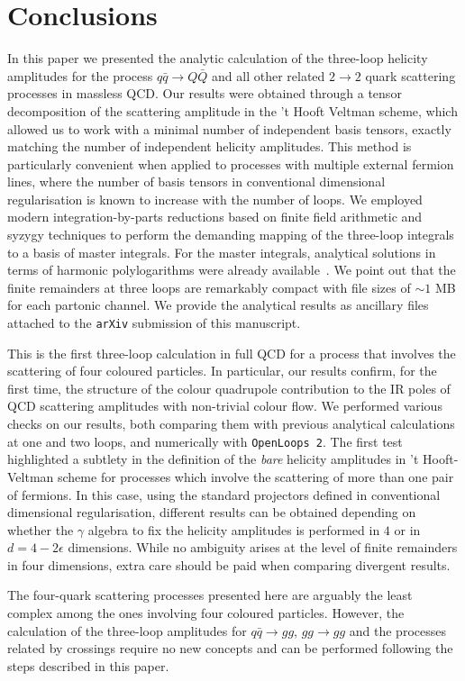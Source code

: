 
\section{Conclusions}
\label{conclusions}
In this paper we presented the analytic calculation of the three-loop
helicity amplitudes for the process $q \bar q
\rightarrow Q \bar{Q}$ and all other related $2 \to 2$ quark
scattering processes in massless QCD.  Our results were obtained
through a tensor decomposition of the scattering amplitude in the 't
Hooft Veltman scheme, which allowed us to work with a minimal number
of independent basis tensors, exactly matching the number of
independent helicity amplitudes.  This method is particularly convenient when
applied to processes with multiple external fermion lines, where the
number of basis tensors in conventional dimensional regularisation
is known to increase with the number of
loops.
We employed modern integration-by-parts reductions based on finite field
arithmetic and syzygy techniques to perform the demanding mapping
of the three-loop integrals to a basis of master integrals.
For the master integrals, analytical solutions in terms of harmonic polylogarithms
were already available~\cite{Henn:2020lye}. 
We point out that the finite remainders
at three loops are remarkably compact with file sizes 
of $\sim 1$ MB for each partonic channel. 
We provide the analytical results as ancillary files attached to the 
\texttt{arXiv} submission of this manuscript.

This is the first three-loop calculation in full QCD for a process
that involves the scattering of four coloured particles.  In
particular, our results confirm, for the first time, the structure of the colour
quadrupole contribution to the IR poles of QCD scattering
amplitudes with non-trivial colour flow.  We performed various checks
on our results, both comparing them with previous analytical
calculations at one and two loops, and numerically with
\texttt{OpenLoops 2}.  The first test highlighted a
subtlety in the definition of the \emph{bare} helicity amplitudes 
in 't Hooft-Veltman scheme for processes
which involve the scattering of more than one pair of fermions.
In this case, using the standard projectors defined in
conventional dimensional regularisation, different results 
can be obtained depending on whether the 
$\gamma$ algebra to fix the helicity amplitudes is performed 
in $4$ or in $d=4-2 \epsilon$ dimensions. 
While no ambiguity arises at the level of finite remainders in four dimensions,
extra care should be paid when comparing divergent results.

The four-quark scattering processes presented here are arguably the least
complex among the ones involving four coloured particles. However, the
calculation of the three-loop amplitudes for $q \bar q \rightarrow gg$, $gg \rightarrow gg$ and the processes related by
crossings require no new concepts and can be performed following the steps described in this paper.
